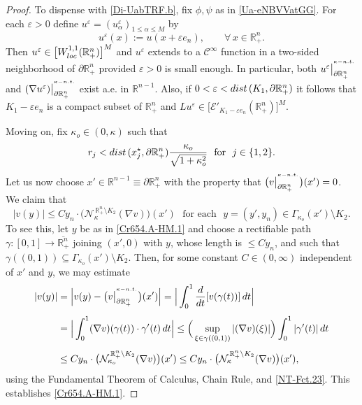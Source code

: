\documentclass[10pt,a4paper]{amsart}
\begin{document}
\begin{proof}
To dispense with \eqref{Di-UabTRF.b}, fix $\phi,\psi$ as in \eqref{Ua-eNBVVatGG}.
For each $\varepsilon>0$ define $u^\varepsilon=(u^\varepsilon_\alpha)_{1\leq\alpha\leq M}$ by 
%
\begin{equation}\label{Nvav-T54.a}
u^\varepsilon(x):=u(x+\varepsilon e_n),\qquad\forall\,x\in{\mathbb{R}}^n_{+}.
\end{equation}
%
Then $u^\varepsilon\in\big[W^{1,1}_{\rm loc}({\mathbb{R}}^n_{+})\big]^{M}$ and $u^\varepsilon$ extends to a  
${\mathscr{C}}^\infty$ function in a two-sided neighborhood of $\partial{\mathbb{R}}^n_{+}$ provided 
$\varepsilon>0$ is small enough. In particular, both 
$u^\varepsilon\big|_{\partial\mathbb{R}^{n}_{+}}^{{}^{\kappa-{\rm n.t.}}}$ and 
$(\nabla u^\varepsilon)\big|_{\partial\mathbb{R}^{n}_{+}}^{{}^{\kappa-{\rm n.t.}}}$ exist a.e. in ${\mathbb{R}}^{n-1}$.
Also, if $0<\varepsilon<{\rm dist}\,(K_1,\partial{\mathbb{R}}^n_{+})$ it follows that 
$K_1-\varepsilon e_n$ is a compact subset of ${\mathbb{R}}^n_{+}$ and 
$Lu^\varepsilon\in\big[{\mathcal{E}}'_{K_1-\varepsilon e_n}(\mathbb{R}^{n}_{+})\big]^M$.

Moving on, fix $\kappa_o\in(0,\kappa)$ such that 
%
\begin{equation}\label{CPTs.i}
r_j<{\rm dist}\,(x^\star_j,\partial{\mathbb{R}}^n_{+})\frac{\kappa_o}{\sqrt{1+\kappa^2_o}}
\,\,\text{ for }\,\,j\in\{1,2\}.
\end{equation}
%
Let us now choose $x'\in{\mathbb{R}}^{n-1}\equiv\partial{\mathbb{R}}^n_{+}$ 
with the property that $\big(v\big|^{{}^{\kappa-{\rm n.t.}}}_{\partial{\mathbb{R}}^n_{+}}\big)(x')=0$.
We claim that 
%
\begin{equation}\label{Cr654.A-HM.1}
|v(y)|\leq Cy_n\cdot\big({\mathcal{N}}^{\,\mathbb{R}^{n}_{+}\setminus K_2}_{\kappa}(\nabla v)\big)(x')
\,\,\text{ for each }\,\,y=(y',y_n)\in\Gamma_{\kappa_o}(x')\setminus K_2.
\end{equation}
% 
To see this, let $y$ be as in \eqref{Cr654.A-HM.1} and choose a rectifiable path 
$\gamma:[0,1]\to\overline{{\mathbb{R}}^n_{+}}$ joining $(x',0)$ with $y$, whose length is $\leq Cy_n$, 
and such that $\gamma((0,1))\subseteq\Gamma_{\kappa_o}(x')\setminus K_2$.
Then, for some constant $C\in(0,\infty)$ independent of $x'$ and $y$, we may estimate 
%
\begin{align}\label{Cr654.A-HM.1.xxx}
|v(y)| &=\Big|v(y)-\big(v\big|^{{}^{\kappa-{\rm n.t.}}}_{\partial{\mathbb{R}}^n_{+}}\big)(x')\Big|
=\Big|\int_0^1\frac{d}{dt}[v(\gamma(t))]\,dt\Big|
\nonumber\\[4pt]
&=\Big|\int_0^1(\nabla v)(\gamma(t))\cdot\gamma'(t)\,dt\Big|
\leq\Big(\sup_{\xi\in\gamma((0,1))}|(\nabla v)(\xi)|\Big)\int_0^1|\gamma'(t)|\,dt
\nonumber\\[4pt]
&\leq Cy_n\cdot\big({\mathcal{N}}^{\,\mathbb{R}^{n}_{+}\setminus K_2}_{\kappa_o}(\nabla v)\big)(x')
\leq Cy_n\cdot\big({\mathcal{N}}^{\,\mathbb{R}^{n}_{+}\setminus K_2}_{\kappa}(\nabla v)\big)(x'),
\end{align}
%
using the Fundamental Theorem of Calculus, Chain Rule, and \eqref{NT-Fct.23}. This establishes \eqref{Cr654.A-HM.1}.


\end{proof}
\end{document}
